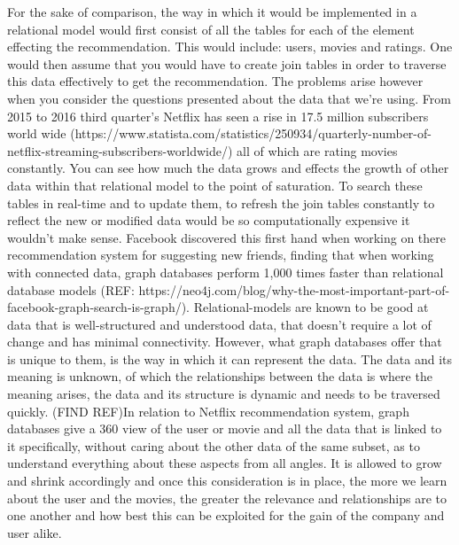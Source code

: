 \documentclass[a4paper]{article}
\begin{document}
For the sake of comparison, the way in which it would be implemented in a relational model would first consist of all the tables for each of the element effecting the recommendation. This would include: users, movies and ratings. One would then assume that you would have to create join tables in order to traverse this data effectively to get the recommendation. The problems arise however when you consider the questions presented about the data that we're using. From 2015 to 2016 third quarter's Netflix has seen a rise in 17.5 million subscribers world wide (https://www.statista.com/statistics/250934/quarterly-number-of-netflix-streaming-subscribers-worldwide/) all of which are rating movies constantly. You can see how much the data grows and effects the growth of other data within that relational model to the point of saturation. To search these tables in real-time and to update them, to refresh the join tables constantly to reflect the new or modified data would be so computationally expensive it wouldn't make sense. Facebook discovered this first hand when working on there recommendation system for suggesting new friends, finding that when working with connected data, graph databases perform 1,000 times faster than relational database models (REF: https://neo4j.com/blog/why-the-most-important-part-of-facebook-graph-search-is-graph/). Relational-models are known to be good at data that is well-structured and understood data, that doesn't require a lot of change and has minimal connectivity. However, what graph databases offer that is unique to them, is the way in which it can represent the data. The data and its meaning is unknown, of which the relationships between the data is where the meaning arises, the data and its structure is dynamic and needs to be traversed quickly. (FIND REF)In relation to Netflix recommendation system, graph databases give a 360 view of the user or movie and all the data that is linked to it specifically, without caring about the other data of the same subset, as to understand everything about these aspects from all angles. It is allowed to grow and shrink accordingly and once this consideration is in place, the more we learn about the user and the movies, the greater the relevance and relationships are to one another and how best this can be exploited for the gain of the company and user alike. \par
\end{document}
